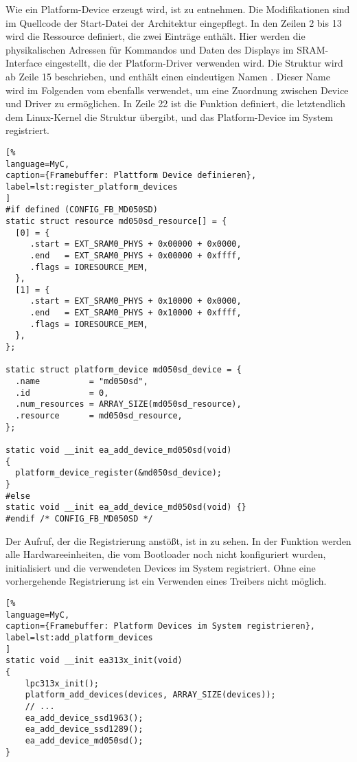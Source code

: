 Wie ein Platform-Device erzeugt wird, ist  zu entnehmen. Die Modifikationen sind im Quellcode der Start-Datei der Architektur  eingepflegt. In den Zeilen 2 bis 13 wird die Ressource  definiert, die zwei Einträge enthält. Hier werden die physikalischen Adressen für Kommandos und Daten des Displays im SRAM-Interface eingestellt, die der Platform-Driver verwenden wird. Die Struktur  wird ab Zeile 15 beschrieben, und enthält einen eindeutigen Namen . Dieser Name wird im Folgenden vom  ebenfalls verwendet, um eine Zuordnung zwischen Device und Driver zu ermöglichen.
In Zeile 22 ist die Funktion definiert, die letztendlich dem Linux-Kernel die Struktur  übergibt, und das Platform-Device im System registriert. 
\begin{lstlisting}[%
language=MyC,
caption={Framebuffer: Plattform Device definieren},
label=lst:register_platform_devices
]
#if defined (CONFIG_FB_MD050SD)
static struct resource md050sd_resource[] = {
  [0] = {
     .start = EXT_SRAM0_PHYS + 0x00000 + 0x0000,
     .end   = EXT_SRAM0_PHYS + 0x00000 + 0xffff,
     .flags = IORESOURCE_MEM,
  },
  [1] = {
     .start = EXT_SRAM0_PHYS + 0x10000 + 0x0000,
     .end   = EXT_SRAM0_PHYS + 0x10000 + 0xffff,
     .flags = IORESOURCE_MEM,
  },
};

static struct platform_device md050sd_device = {
  .name          = "md050sd",
  .id            = 0,
  .num_resources = ARRAY_SIZE(md050sd_resource),
  .resource      = md050sd_resource,
};

static void __init ea_add_device_md050sd(void)
{
  platform_device_register(&md050sd_device);
}
#else
static void __init ea_add_device_md050sd(void) {}
#endif /* CONFIG_FB_MD050SD */
\end{lstlisting}
Der Aufruf, der die Registrierung anstößt, ist in  zu sehen. In der Funktion  werden alle Hardwareeinheiten, die vom Bootloader noch nicht konfiguriert wurden, initialisiert und die verwendeten Devices im System registriert. Ohne eine vorhergehende Registrierung ist ein Verwenden eines Treibers nicht möglich.

\begin{lstlisting}[%
language=MyC,
caption={Framebuffer: Platform Devices im System registrieren},
label=lst:add_platform_devices
]
static void __init ea313x_init(void)
{
	lpc313x_init();
	platform_add_devices(devices, ARRAY_SIZE(devices));
    // ...
	ea_add_device_ssd1963();
	ea_add_device_ssd1289();
	ea_add_device_md050sd();
}
\end{lstlisting}

